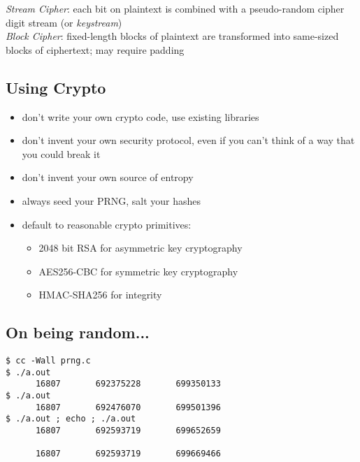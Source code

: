 \documentclass[xga]{xdvislides}
\begin{document}
{\em Stream Cipher}: each bit on plaintext is combined
with a pseudo-random cipher digit stream (or {\em keystream})
\\

{\em Block Cipher}: fixed-length blocks of plaintext
are transformed into same-sized blocks of ciphertext;
may require padding

\subsection{Using Crypto}

\begin{itemize}
	\item don't write your own crypto code, use existing libraries
	\item don't invent your own security protocol,
		even if you can't think of a way that you could break it
	\item don't invent your own source of entropy
	\item always seed your PRNG, salt your hashes
	\item default to reasonable crypto primitives:
		\begin{itemize}
			\item 2048 bit RSA for asymmetric key cryptography
			\item AES256-CBC for symmetric key cryptography
			\item HMAC-SHA256 for integrity
		\end{itemize}
\end{itemize}

\subsection{On being random...}

\begin{verbatim}
$ cc -Wall prng.c
$ ./a.out
      16807       692375228       699350133
$ ./a.out
      16807       692476070       699501396
$ ./a.out ; echo ; ./a.out
      16807       692593719       699652659

      16807       692593719       699669466
\end{verbatim}
\end{document}
